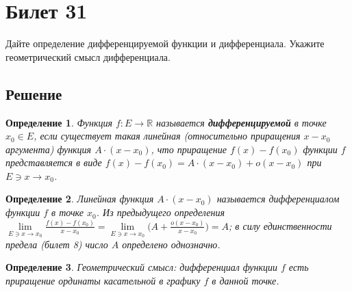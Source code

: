 \documentclass[a4paper,12pt]{article}
\newtheorem*{defi}{Определение}
\begin{document}
    \section*{Билет 31}
    Дайте определение дифференцируемой функции и дифференциала. Укажите
    геометрический смысл дифференциала.

    \subsection*{Решение}
    \begin{defi}
        Функция $f:E\rightarrow \mathbb{R}$ называется
        \textbf{дифференцируемой} в точке $x_0\in E$, если существует такая
        линейная (относительно приращения $x-x_0$ аргумента) функция $A\cdot
        (x-x_0)$, что приращение $f(x) - f(x_0)$ функции $f$ представляется в
        виде $f(x)-f(x_0) = A \cdot (x-x_0) + o(x-x_0)$ при $E \ni x \to x_0$.
    \end{defi}

    \begin{defi}
        Линейная функция $A\cdot(x-x_0)$ называется дифференциалом функции $f$
        в точке $x_0$. Из предыдущего определения
        $\lim\limits_{E\ni x \to x_0}\frac{f(x)-f(x_0)}{x-x_0}
        =
        \lim\limits_{E\ni x \to x_0}\big(A + \frac{o(x-x_0)}{x-x_0} \big) = A$;
        в силу единственности предела (билет 8) число $A$ определено
        однозначно.
    \end{defi}

    \begin{defi}
        Геометрический смысл: дифференциал функции $f$ есть приращение ординаты
        касательной в графику $f$ в данной точке.
    \end{defi}
\end{document}
